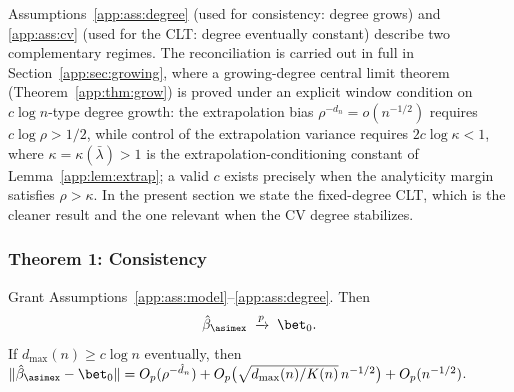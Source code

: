 \begin{remark}\label{app:rem:cvreconcile}
Assumptions~\ref{app:ass:degree} (used for consistency: degree grows) and
\ref{app:ass:cv} (used for the CLT: degree eventually constant) describe two
complementary regimes. The reconciliation is carried out in full in
Section~\ref{app:sec:growing}, where a growing-degree central limit theorem
(Theorem~\ref{app:thm:grow}) is proved under an explicit window condition on
$c\log n$-type degree growth: the extrapolation bias
$\rho^{-d_n}=o(n^{-1/2})$ requires $c\log\rho>1/2$, while control of the
extrapolation variance requires $2c\log\kappa<1$, where
$\kappa=\kappa(\bar\lambda)>1$ is the extrapolation-conditioning constant
of Lemma~\ref{app:lem:extrap}; a valid $c$ exists precisely when the
analyticity margin satisfies $\rho>\kappa$. In the present section we
state the fixed-degree CLT, which is the cleaner result and the one
relevant when the CV degree stabilizes.
\end{remark}

\subsubsection{Theorem 1: Consistency}\label{app:sec:consistency}

\begin{theorem}\label{app:thm:cons}
Grant Assumptions~\ref{app:ass:model}--\ref{app:ass:degree}. Then
\[
  \hat\beta_{\asimex}\;\xrightarrow{p}\;\bet_0 .
\]
If $d_{\max}(n)\ge c\log n$ eventually, then
$\|\hat\beta_{\asimex}-\bet_0\|=O_p(\rho^{-\hat d_n})
+O_p\bigl(\sqrt{d_{\max}(n)/K(n)}\,n^{-1/2}\bigr)
+O_p(n^{-1/2})$.
\end{theorem}

